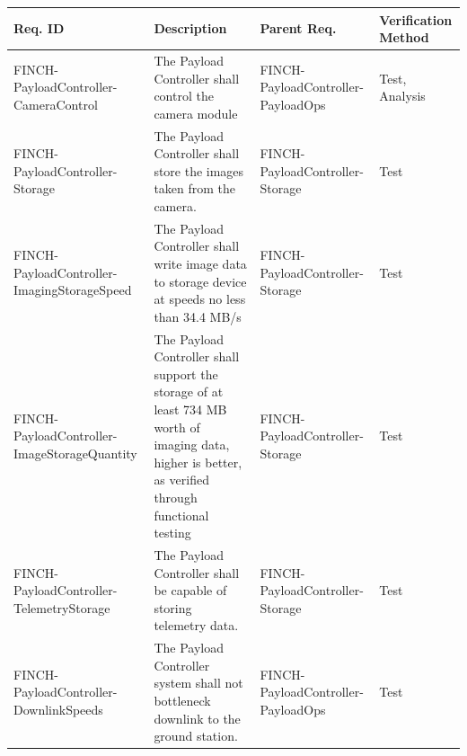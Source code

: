 \documentclass[12pt,a4paper]{article}
\begin{document}
\begin{table}[H]
  \centering
  \begin{tabular}{|>{\centering\arraybackslash}m{3cm}
    |>{\raggedright\arraybackslash}m{7cm}
    |>{\centering\arraybackslash}m{3cm}
    |>{\centering\arraybackslash}m{2.5cm}|}\hline
    \textbf{Req. ID}                             & \centering \textbf{Description}                                                                                                                                                          & \textbf{Parent Req.}                   & \textbf{Verification Method} \\\hline
    FINCH-PayloadController-CameraControl        & The Payload Controller shall control the camera module                                                                                                                                   & FINCH-PayloadController-PayloadOps     & Test, Analysis               \\\hline
    FINCH-PayloadController-Storage              & The Payload Controller shall store the images taken from the camera.                                                                                                                     & FINCH-PayloadController-Storage        & Test                         \\\hline
    FINCH-PayloadController-ImagingStorageSpeed  & The Payload Controller shall write image data to storage device at speeds no less than 34.4 MB/s                                                                                         & FINCH-PayloadController-Storage        & Test                         \\\hline
    FINCH-PayloadController-ImageStorageQuantity & The Payload Controller shall support the storage of at least 734 MB worth of imaging data, higher is better, as verified through functional testing                                      & FINCH-PayloadController-Storage        & Test                         \\\hline
    FINCH-PayloadController-TelemetryStorage     & The Payload Controller shall be capable of storing telemetry data.                                                                                                                       & FINCH-PayloadController-Storage        & Test                         \\\hline
    FINCH-PayloadController-DownlinkSpeeds       & The Payload Controller system shall not bottleneck downlink to the ground station.                                                                                                       & FINCH-PayloadController-PayloadOps     & Test                         \\\hline

\end{tabular}
\end{table}
\end{document}
